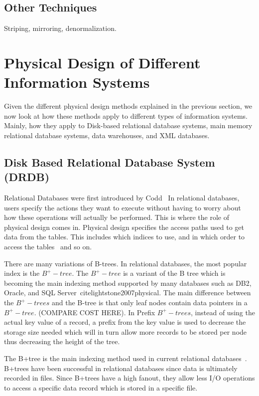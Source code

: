 \documentclass[12pt,a4paper]{article}
\begin{document}
\subsection{Other Techniques}

Striping, mirroring, denormalization.

\section{Physical Design of Different Information Systems}
\label{SEC-DIFFSYS}

Given the different physical design methods explained in the previous section, we now look at how these methods apply to different types of information systems. Mainly, how they apply to Disk-based relational database systems, main memory relational database systems, data warehouses, and XML databases.

\subsection{Disk Based Relational Database System (DRDB)}
\label{SEC-DDRDB}

Relational Databases were first introduced by Codd~\cite{codd1970relational}
In relational databases, users specify the actions they want to execute without having to worry about how these operations will actually be performed. This is where the role of physical design comes in. Physical design specifies the access paths used to get data from the tables. This includes which indices to use, and in which order to access the tables~\cite{finkelstein1988physical} and so on.


There are many variations of B-trees. In relational databases, the most popular index is the $B^{+}-tree$. The $B^{+}-tree$ is a variant of the B  tree which is becoming the main indexing method supported by many databases such as DB2, Oracle, and SQL Server~cite{lightstone2007physical}. The main difference between the $B^{+}-trees$ and the B-tree is that only leaf nodes contain data pointers in a $B^{+}-tree$. (COMPARE COST HERE). In Prefix $B^{+}-trees$, instead of using the actual key value of a record, a prefix from the key value is used to decrease the storage size needed which will in turn allow more records to be stored per node thus decreasing the height of the tree.

The B+tree is the main indexing method used in current relational databases~\cite{lightstone2007physical}. B+trees have been successful in relational databases since data is ultimately recorded in files. Since B+trees have a high fanout, they allow less I/O operations to access a specific data record which is stored in a specific file.
\end{document}
